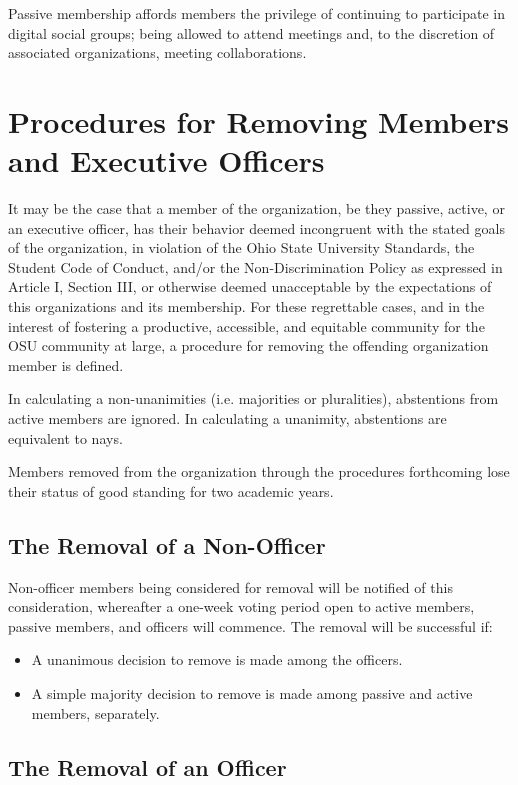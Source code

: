 \documentclass[12pt,letterpaper]{article}
\begin{document}
Passive membership affords members the privilege of continuing to participate in digital
social groups; being allowed to attend meetings and, to the discretion of associated
organizations, meeting collaborations.

\clearpage

\section{Procedures for Removing Members and Executive Officers}

It may be the case that a member of the organization, be they passive, active, or an
executive officer, has their behavior deemed incongruent with the stated goals of the
organization, in violation of the Ohio State University Standards, the Student Code of
Conduct, and/or the Non-Discrimination Policy as expressed in Article I, Section III, or
otherwise deemed unacceptable by the expectations of this organizations and its
membership. For these regrettable cases, and in the interest of fostering a productive,
accessible, and equitable community for the OSU community at large, a procedure for
removing the offending organization member is defined.

In calculating a non-unanimities (i.e. majorities or pluralities), abstentions from
active members are ignored. In calculating a unanimity, abstentions are equivalent to
nays.

Members removed from the organization through the procedures forthcoming lose their
status of good standing for two academic years.

\subsection{The Removal of a Non-Officer}

Non-officer members being considered for removal will be notified of this consideration,
whereafter a one-week voting period open to active members, passive members, and officers
will commence. The removal will be successful if:

\begin{itemize}
  \item A unanimous decision to remove is made among the officers.
  \item A simple majority decision to remove is made among passive and active members, separately.
\end{itemize}

\subsection{The Removal of an Officer}
\end{document}
